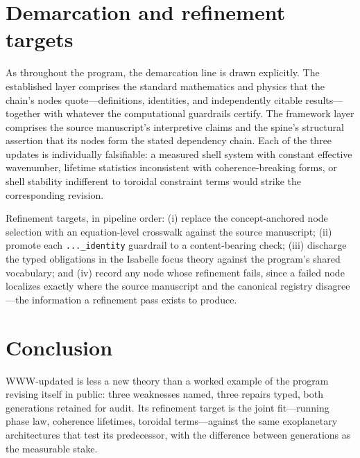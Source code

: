 \documentclass[11pt]{article}
\theoremstyle{remark}
\begin{document}
\section{Demarcation and refinement targets}
\label{sec:demarc}

As throughout the program, the demarcation line is drawn explicitly. The established layer comprises the standard mathematics and physics that the chain's nodes quote---definitions, identities, and independently citable results---together with whatever the computational guardrails certify. The framework layer comprises the source manuscript's interpretive claims and the spine's structural assertion that its nodes form the stated dependency chain. Each of the three updates is individually falsifiable: a measured shell system with constant effective wavenumber, lifetime statistics inconsistent with coherence-breaking forms, or shell stability indifferent to toroidal constraint terms would strike the corresponding revision.

Refinement targets, in pipeline order: (i) replace the concept-anchored node selection with an equation-level crosswalk against the source manuscript; (ii) promote each \texttt{...\_identity} guardrail to a content-bearing check; (iii) discharge the typed obligations in the Isabelle focus theory against the program's shared vocabulary; and (iv) record any node whose refinement fails, since a failed node localizes exactly where the source manuscript and the canonical registry disagree---the information a refinement pass exists to produce.

\section{Conclusion}
\label{sec:conc}

WWW-updated is less a new theory than a worked example of the program revising itself in public: three weaknesses named, three repairs typed, both generations retained for audit. Its refinement target is the joint fit---running phase law, coherence lifetimes, toroidal terms---against the same exoplanetary architectures that test its predecessor, with the difference between generations as the measurable stake.
\end{document}
